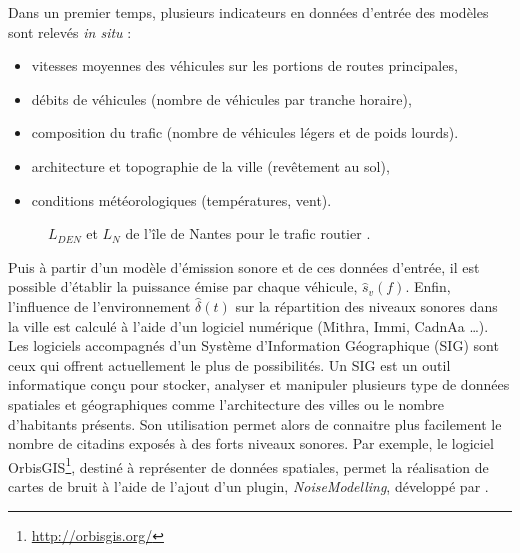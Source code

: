 Dans un premier temps, plusieurs indicateurs en données d'entrée des modèles sont relevés \textit{in situ} :  

\begin{itemize}
\item vitesses moyennes des véhicules sur les portions de routes principales,
\item débits de véhicules (nombre de véhicules par tranche horaire),
\item composition du trafic (nombre de véhicules légers et de poids lourds).
\item architecture et topographie de la ville (revêtement au sol), 
\item conditions météorologiques (températures, vent).\\
\end{itemize}

\begin{figure}[t]
\centering
{}
\caption{$L_{DEN}$  et $L_N$  de l'île de Nantes pour le trafic routier \cite{nantes_carte}.}
\label{fig:carto_nantes}
\end{figure}

Puis à partir d'un modèle d'émission sonore et de ces données d'entrée, il est possible d'établir la puissance émise par chaque véhicule, $\hat{s}_{v}(f)$.
Enfin, l'influence de l'environnement $\hat{\delta}(t)$ sur la répartition des niveaux sonores dans la ville est calculé à l'aide d'un logiciel numérique (Mithra, Immi, CadnAa \dots). Les logiciels accompagnés d'un Système d'Information Géographique (SIG) sont ceux qui offrent actuellement le plus de possibilités. Un SIG est un outil informatique conçu pour stocker, analyser et manipuler plusieurs type de données spatiales et géographiques comme l'architecture des villes ou le nombre d'habitants présents. 
Son utilisation permet alors de connaitre plus facilement le nombre de citadins exposés à des forts niveaux sonores. 
Par exemple, le logiciel OrbisGIS\footnote{\url{http://orbisgis.org/}}, destiné à représenter de données spatiales, permet la réalisation de cartes de bruit à l'aide de l'ajout d'un plugin, \textit{NoiseModelling}, développé par \cite{fortin}. \\

